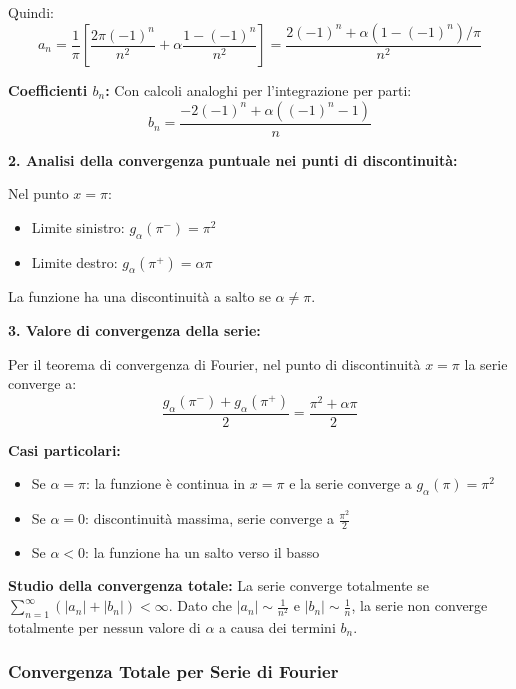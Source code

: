 \begin{esempio}
Quindi:
\[ a_n = \frac{1}{\pi} \left[ \frac{2\pi (-1)^n}{n^2} + \alpha \frac{1 - (-1)^n}{n^2} \right] = \frac{2(-1)^n + \alpha(1 - (-1)^n)/\pi}{n^2} \]

\textbf{Coefficienti \(b_n\):}
Con calcoli analoghi per l'integrazione per parti:
\[ b_n = \frac{-2(-1)^n + \alpha((-1)^n - 1)}{n} \]

\textbf{2. Analisi della convergenza puntuale nei punti di discontinuità:}

Nel punto \(x = \pi\):
\begin{itemize}
    \item Limite sinistro: \(g_\alpha(\pi^-) = \pi^2\)
    \item Limite destro: \(g_\alpha(\pi^+) = \alpha\pi\)
\end{itemize}

La funzione ha una discontinuità a salto se \(\alpha \neq \pi\).

\textbf{3. Valore di convergenza della serie:}

Per il teorema di convergenza di Fourier, nel punto di discontinuità \(x = \pi\) la serie converge a:
\[ \frac{g_\alpha(\pi^-) + g_\alpha(\pi^+)}{2} = \frac{\pi^2 + \alpha\pi}{2} \]

\textbf{Casi particolari:}
\begin{itemize}
    \item Se \(\alpha = \pi\): la funzione è continua in \(x = \pi\) e la serie converge a \(g_\alpha(\pi) = \pi^2\)
    \item Se \(\alpha = 0\): discontinuità massima, serie converge a \(\frac{\pi^2}{2}\)
    \item Se \(\alpha < 0\): la funzione ha un salto verso il basso
\end{itemize}

\textbf{Studio della convergenza totale:}
La serie converge totalmente se \(\sum_{n=1}^{\infty} (|a_n| + |b_n|) < \infty\).
Dato che \(|a_n| \sim \frac{1}{n^2}\) e \(|b_n| \sim \frac{1}{n}\), la serie non converge totalmente per nessun valore di \(\alpha\) a causa dei termini \(b_n\).
\end{esempio}

\subsubsection{Convergenza Totale per Serie di Fourier}

